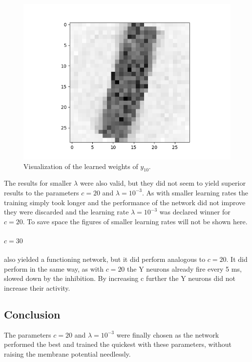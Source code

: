 \begin{figure}
  \includegraphics[width=\linewidth]{figures/angleNetwork/c20_3weights2.png}
  \caption{Visualization of the learned weights of $y_{10}$.}
  \label{fig:c20_3weights2.png}
\end{figure}

The results for smaller $\lambda$ were also valid, but they did not seem to yield superior results to the parameters $c = 20$ and $\lambda = 10^{-3}$. As with smaller learning rates the training simply took longer and the performance of the network did not improve they were discarded and  the learning rate $\lambda = 10^{-3}$ was declared winner for $c = 20$. To save space the figures of smaller learning rates will not be shown here.

\paragraph{$c = 30$}
also yielded a functioning network, but it did perform analogous to $c = 20$. It did perform in the same way, as with $c = 20$ the Y neurons already fire every 5 ms, slowed down by the inhibition. By increasing c further the Y neurons did not increase their activity.

\subsection{Conclusion}

The parameters $c = 20$ and $\lambda = 10^{-3}$ were finally chosen as the network performed the best and trained the quickest with these parameters, without raising the membrane potential needlessly.

